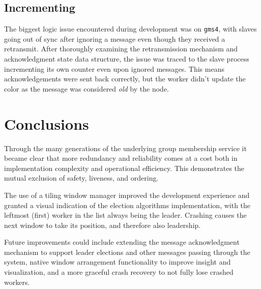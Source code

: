 \documentclass[a4paper, 11pt]{article}
\begin{document}
\subsection{Incrementing}

The biggest logic issue encountered during development was on \texttt{gms4}, with slaves going out of sync after ignoring a message even though they received a retransmit.
After thoroughly examining the retransmission mechanism and acknowledgment state data structure, the issue was traced to the slave process incrementing its own counter even upon ignored messages.
This means acknowledgements were sent back correctly, but the worker didn't update the color as the message was considered \textit{old} by the node.

\section{Conclusions}

Through the many generations of the underlying group membership service it became clear that more redundancy and reliability comes at a cost both in implementation complexity and operational efficiency. This demonstrates the mutual exclusion of safety, liveness, and ordering.

The use of a tiling window manager improved the development experience and granted a visual indication of the election algorithms implementation, with the leftmost (first) worker in the list always being the leader. Crashing causes the next window to take its position, and therefore also leadership.

Future improvements could include extending the message acknowledgment mechanism to support leader elections and other messages passing through the system,
native window arrangement functionality to improve insight and visualization, and a more graceful crash recovery to not fully lose crashed workers.
\end{document}
